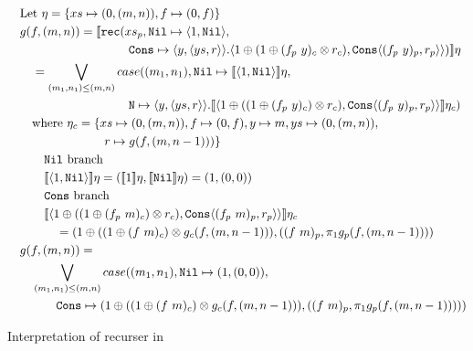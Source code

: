 \begin{figure}
  \label{fig:ws_map_interpretation}
  \caption{Interpretation of recurser in }
  \[\begin{split}
      &\quad \text{Let } \eta = \{ xs \mapsto (0, (m, n)), f \mapsto (0, f)\}\\
      &\quad g(f, (m, n)) = \llbracket \texttt{rec}(xs_p, \texttt{Nil} \mapsto \langle 1, \texttt{Nil}\rangle,\\
      &\qquad\quad\quad\quad\qquad\quad\quad\quad \texttt{Cons} \mapsto \langle y, \langle ys, r \rangle \rangle . \langle 1 \oplus (1 \oplus (f_p\ y)_c \otimes r_c), \texttt{Cons}\langle (f_p\ y)_p, r_p\rangle\rangle) \rrbracket \eta\\
      &\qquad = \bigvee\limits_{(m_1, n_1) \leq (m, n)} case((m_1, n_1), \texttt{Nil} \mapsto \llbracket \langle 1, \texttt{Nil} \rangle \rrbracket \eta, \\
      &\qquad\quad\quad\quad\qquad\quad\quad\quad \texttt{N} \mapsto \langle y, \langle ys, r \rangle \rangle . \llbracket \langle 1 \oplus ((1 \oplus (f_p\ y)_c) \otimes r_c), \texttt{Cons} \langle (f_p\ y)_p, r_p \rangle \rangle \rrbracket \eta_c) \\
      &\qquad \text{where } \eta_c = \{xs \mapsto (0, (m, n)), f \mapsto (0, f), y \mapsto m, ys \mapsto (0, (m, n)), \\
      &\qquad\quad\quad\quad\quad\quad\quad r \mapsto g(f, (m, n-1)))\} \\
      &\qquad\quad \text{\texttt{Nil} branch} \\
      &\qquad\quad \llbracket \langle 1, \texttt{Nil} \rangle \rrbracket \eta = (\llbracket 1 \rrbracket \eta , \llbracket \texttt{Nil} \rrbracket \eta) = (1, (0, 0)) \\
      &\qquad\quad \text{\texttt{Cons} branch} \\
      &\qquad\quad  \llbracket \langle 1 \oplus ((1 \oplus (f_p\ m)_c) \otimes r_c), \texttt{Cons} \langle (f_p\ m)_p, r_p \rangle \rangle \rrbracket \eta_c \\
      &\qquad\quad\quad = (1 \oplus ((1 \oplus (f\ m)_c) \otimes g_c(f, (m, n-1))), ((f\ m)_p, \pi_1 g_p(f, (m, n-1)))) \\
      &\quad g(f, (m, n)) = \\
      &\qquad \bigvee\limits_{(m_1, n_1) \leq (m, n)} case((m_1, n_1), \texttt{Nil} \mapsto (1, (0, 0)), \\
      &\qquad\quad\quad \texttt{Cons} \mapsto (1 \oplus ((1 \oplus (f\ m)_c) \otimes g_c(f, (m, n-1))), ((f\ m)_p, \pi_1 g_p(f, (m, n-1))))) 
  \end{split}\]
\end{figure}


